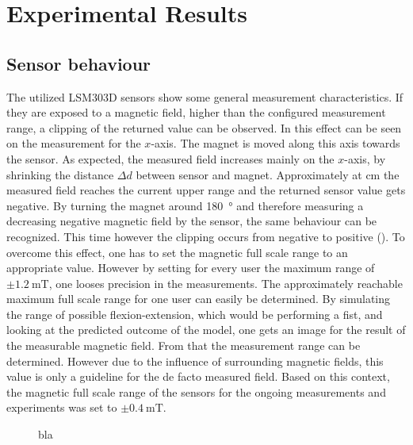 \lhead[\chaptername~\thechapter]{\rightmark}

\rhead[\leftmark]{}

\lfoot[\thepage]{}

\cfoot{}

\rfoot[]{\thepage}

\chapter{Experimental Results} \label{cha:results}

\section{Sensor behaviour} \label{sec:dataRes}

The utilized LSM303D sensors show some general measurement characteristics. If they are exposed to a magnetic field, higher than the configured measurement range, a clipping of the returned value can be observed. In  this effect can be seen on the measurement for the $ x $-axis. The magnet is moved along this axis towards the sensor. As expected, the measured field increases mainly on the $ x $-axis, by shrinking the distance $ \varDelta d $ between sensor and magnet. Approximately at  cm the measured field reaches the current upper range and the returned sensor value gets negative. By turning the magnet around \SI{180}{\degree} and therefore measuring a decreasing negative magnetic field by the sensor, the same behaviour can be recognized. This time however the clipping occurs from negative to positive (). To overcome this effect, one has to set the magnetic full scale range to an appropriate value. However by setting for every user the maximum range of $ \pm \SI{1.2}{\milli \tesla} $, one looses precision in the measurements. The approximately reachable maximum full scale range for one user can easily be determined. By simulating the range of possible flexion-extension, which would be performing a fist, and looking at the predicted outcome of the  model, one gets an image for the result of the measurable magnetic field. From that the measurement range can be determined. However due to the influence of surrounding magnetic fields, this value is only a guideline for the de facto measured field. Based on this context, the magnetic full scale range of the sensors for the ongoing measurements and experiments was set to $ \pm \SI{0.4}{\milli \tesla} $.

\begin{figure}
\hfil
{}
\caption{bla}
\label{fig:clipping}
\end{figure}

